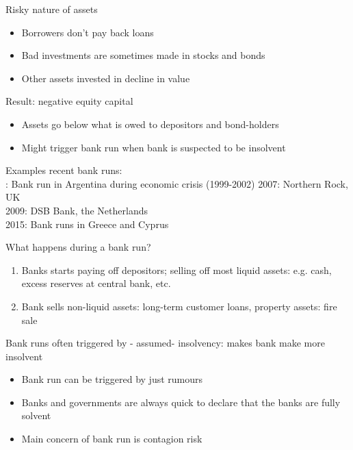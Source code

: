 \documentclass{beamer}
\begin{document}
\begin{frame}
 Risky nature of assets
\begin{itemize}
  \item Borrowers don't pay back loans
  \item Bad investments are sometimes made in stocks and bonds
  \item Other assets invested in decline in value
\end{itemize}
\medskip
 Result: negative equity capital
 \begin{itemize}
   \item Assets go below what is owed to depositors and bond-holders
   \item Might trigger bank run when bank is suspected to be insolvent
 \end{itemize}  
\end{frame}

\begin{frame}
 Examples recent bank runs:\\
 : Bank run in Argentina during economic crisis (1999-2002)
 2007: Northern Rock, UK\\
 2009: DSB Bank, the Netherlands\\
 2015: Bank runs in Greece and Cyprus
\end{frame}

\begin{frame}
  What happens during a bank run? 
\begin{enumerate}
  \item Banks starts paying off depositors; selling off most liquid assets: e.g. cash, excess reserves at central bank, etc.
  \item Bank sells non-liquid assets: long-term customer loans, property assets: fire sale
\end{enumerate}
 \medskip
 Bank runs often triggered by - assumed- insolvency: makes bank make more insolvent
 \begin{itemize}
   \item Bank run can be triggered by just rumours
   \item Banks and governments are always quick to declare that the banks are fully solvent
   \item Main concern of bank run is contagion risk
 \end{itemize}
\end{frame}
\end{document}
